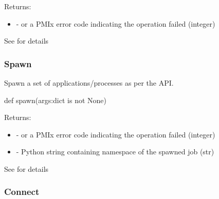 Returns:
\begin{itemize}
    \item {} -  or a \ac{PMIx} error code indicating the operation failed (integer)
\end{itemize}

See  for details


\subsubsection{Spawn}

\summary

Spawn a set of applications/processes as per the  API.

\format

\pyspecificstart
\begin{codepar}
def spawn(args:dict is not None)
\end{codepar}
\pyspecificend

\begin{arglist}
\end{arglist}

Returns:
\begin{itemize}
    \item {} -  or a \ac{PMIx} error code indicating the operation failed (integer)
    \item {} - Python string containing namespace of the spawned job (str)
\end{itemize}

See  for details


\subsubsection{Connect}

